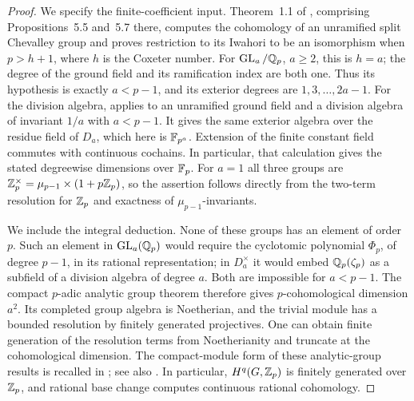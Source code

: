 \begin{proof}
We specify the finite-coefficient input.  Theorem~1.1 of
\cite{DLH}, comprising Propositions~5.5 and~5.7 there, computes the cohomology
of an unramified split Chevalley group and proves restriction to its Iwahori
to be an isomorphism when $p>h+1$, where $h$ is the Coxeter number.
For $\operatorname{GL}_a/\mathbb Q_p$, $a\geq2$, this is $h=a$; the degree of the ground field and
its ramification index are both one.  Thus its hypothesis is exactly
$a<p-1$, and its exterior degrees are $1,3,\ldots,2a-1$.
For the division algebra, \cite[\S5.2, Proposition~5.12]{DLH} applies to an
unramified ground field and a division algebra of invariant $1/a$ with
$a<p-1$.  It gives the same exterior algebra over the residue field of
$D_a$, which here is $\mathbb F_{p^a}$.  Extension of the finite constant field
commutes with continuous cochains.  In particular, that calculation gives
the stated degreewise dimensions over $\mathbb F_p$.  For $a=1$ all three groups
are $\mathbb Z_p^{\times}=\mu_{p-1}\times(1+p\mathbb Z_p)$, so the assertion follows
directly from the two-term resolution for $\mathbb Z_p$ and exactness of
$\mu_{p-1}$-invariants.

We include the integral deduction.  None of these groups has an element of
order $p$.  Such an element in $\operatorname{GL}_a(\mathbb Q_p)$ would require the cyclotomic
polynomial $\Phi_p$, of degree $p-1$, in its rational representation; in
$D_a^{\times}$ it would embed $\mathbb Q_p(\zeta_p)$ as a subfield of a division
algebra of degree $a$.  Both are impossible for $a<p-1$.  The compact
$p$-adic analytic group theorem therefore gives $p$-cohomological dimension
$a^2$.  Its completed group algebra is Noetherian, and the trivial module
has a bounded resolution by finitely generated projectives.  One can obtain
finite generation of the resolution terms from Noetherianity and truncate
at the cohomological dimension.  The compact-module form of these
analytic-group results is recalled in
\cite[Sections~1.1--1.2]{Venjakob}; see also \cite{Lazard,SerreGalois}.
In particular, $H^q(G,\mathbb Z_p)$ is finitely generated over $\mathbb Z_p$, and rational
base change computes continuous rational cohomology.


\end{proof}
